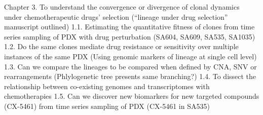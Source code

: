 Chapter 3. To understand the convergence or divergence of clonal dynamics under chemotherapeutic drugs’ selection (“lineage under drug selection” manuscript outlined)
1.1. Estimating the quantitative fitness of clones from time series sampling of PDX with drug perturbation (SA604, SA609, SA535, SA1035)
1.2.  Do the same clones mediate drug resistance or sensitivity over multiple instances of the same PDX (Using genomic markers of lineage at single cell level)
1.3. Can we compare the lineages to be compared when defined by CNA, SNV or rearrangements (Phlylogenetic tree presents same branching?) 	
1.4. To dissect the relationship between co-existing genomes and transcriptomes with chemotherapies
1.5. Can we discover new biomarkers for new targeted compounds (CX-5461) from time series sampling of PDX (CX-5461 in SA535) 

